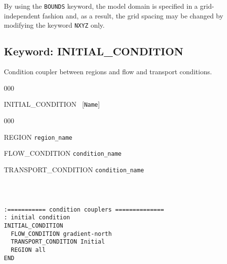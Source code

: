 \noindent
By using the {\tt BOUNDS} keyword, the model domain is specified in a grid-independent fashion and, as a result, the grid spacing may be changed by modifying the keyword {\tt NXYZ} only.

\hyperlink{target_key}{\return}

\hyperlink{target_input_file}{\returnb}


\newpage
\protect\hypertarget{target_init}{}

\subsection{Keyword: INITIAL\_CONDITION}

 Condition coupler between regions and flow and transport conditions.

\begin{deflist}{000}
\item[INITIAL\_CONDITION] \ [{\tt Name}]
\begin{deflist}{000}
\item[REGION] {\tt region\_name}
\item[FLOW\_CONDITION] {\tt condition\_name}
\item[TRANSPORT\_CONDITION] {\tt condition\_name}
\end{deflist}
\item[\keyend] ~
\end{deflist}


\begin{mdframed}


\begin{verbatim}

:=========== condition couplers ==============
: initial condition
INITIAL_CONDITION
  FLOW_CONDITION gradient-north
  TRANSPORT_CONDITION Initial
  REGION all
END
\end{verbatim}
\end{mdframed}

\hyperlink{target_key}{\return}


